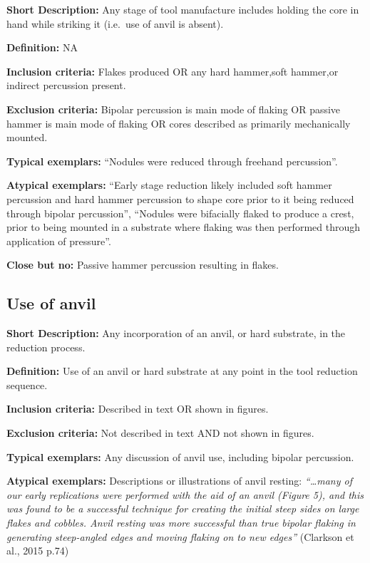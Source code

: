 \documentclass[
]{article}
\begin{document}
\textbf{Short Description:} Any stage of tool manufacture includes
holding the core in hand while striking it (i.e.~use of anvil is
absent).

\textbf{Definition:} NA

\textbf{Inclusion criteria:} Flakes produced OR any hard hammer,soft
hammer,or indirect percussion present.

\textbf{Exclusion criteria:} Bipolar percussion is main mode of flaking
OR passive hammer is main mode of flaking OR cores described as
primarily mechanically mounted.

\textbf{Typical exemplars:} ``Nodules were reduced through freehand
percussion''.

\textbf{Atypical exemplars:} ``Early stage reduction likely included
soft hammer percussion and hard hammer percussion to shape core prior to
it being reduced through bipolar percussion'', ``Nodules were bifacially
flaked to produce a crest, prior to being mounted in a substrate where
flaking was then performed through application of pressure''.

\textbf{Close but no:} Passive hammer percussion resulting in flakes.

\hypertarget{use-of-anvil}{%
\subsection{Use of anvil}\label{use-of-anvil}}

\textbf{Short Description:} Any incorporation of an anvil, or hard
substrate, in the reduction process.

\textbf{Definition:} Use of an anvil or hard substrate at any point in
the tool reduction sequence.

\textbf{Inclusion criteria:} Described in text OR shown in figures.

\textbf{Exclusion criteria:} Not described in text AND not shown in
figures.

\textbf{Typical exemplars:} Any discussion of anvil use, including
bipolar percussion.

\textbf{Atypical exemplars:} Descriptions or illustrations of anvil
resting: \emph{``\ldots many of our early replications were performed
with the aid of an anvil (Figure 5), and this was found to be a
successful technique for creating the initial steep sides on large
flakes and cobbles. Anvil resting was more successful than true bipolar
flaking in generating steep-angled edges and moving flaking on to new
edges''} (Clarkson et al., 2015 p.74)
\end{document}

